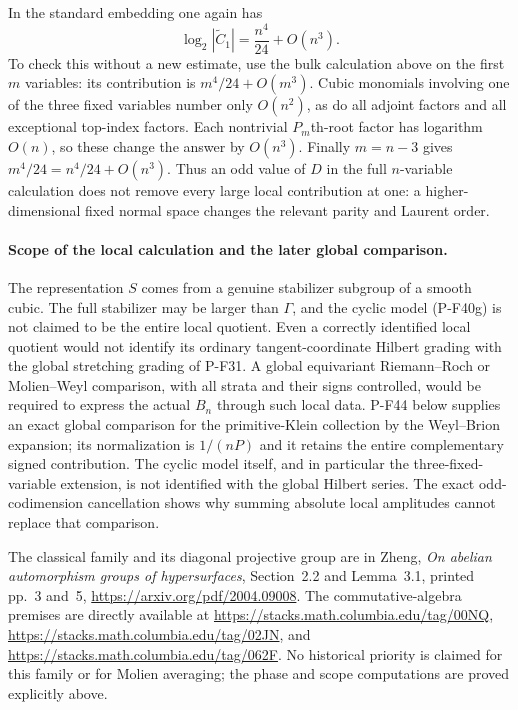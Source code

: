 \documentclass[11pt,a4paper]{article}
\begin{document}
In the standard embedding one again has
\[
                  \log_2|\widetilde C_1|
                             =\frac{n^4}{24}+O(n^3).
 \tag{P-F40o}
\]
To check this without a new estimate, use the bulk calculation
above on the first $m$ variables: its contribution is
$m^4/24+O(m^3)$. Cubic monomials involving one of the three
fixed variables number only $O(n^2)$, as do all adjoint
factors and all exceptional top-index factors. Each nontrivial
$P_m$th-root factor has logarithm $O(n)$, so these change the
answer by $O(n^3)$. Finally $m=n-3$ gives
$m^4/24=n^4/24+O(n^3)$.
Thus an odd value of $D$ in the full $n$-variable calculation does not remove every
large local contribution at one: a higher-dimensional fixed
normal space changes the relevant parity and Laurent order.

\paragraph{Scope of the local calculation and the later global comparison.}
The representation $S$ comes from a genuine stabilizer subgroup
of a smooth cubic. The full stabilizer may be larger than
$\Gamma$, and the cyclic model (P-F40g) is not claimed to be
the entire local quotient. Even a correctly identified local
quotient would not identify its ordinary tangent-coordinate
Hilbert grading with the global stretching grading of P-F31.
A global equivariant Riemann--Roch or Molien--Weyl comparison,
with all strata and their signs controlled, would be required
to express the actual $B_n$ through such local data.
P-F44 below supplies an exact global comparison for the
primitive-Klein collection by the Weyl--Brion expansion;
its normalization is $1/(nP)$ and it retains the entire
complementary signed contribution. The cyclic model itself,
and in particular the three-fixed-variable extension, is
not identified with the global Hilbert series. The exact
odd-codimension cancellation shows why summing absolute
local amplitudes cannot replace that comparison.

The classical family and its diagonal projective group are in
Zheng, \emph{On abelian automorphism groups of hypersurfaces},
Section~2.2 and Lemma~3.1, printed pp.~3 and~5,
\url{https://arxiv.org/pdf/2004.09008}.
The commutative-algebra premises are directly available at
\url{https://stacks.math.columbia.edu/tag/00NQ},
\url{https://stacks.math.columbia.edu/tag/02JN}, and
\url{https://stacks.math.columbia.edu/tag/062F}.
No historical priority is claimed for this family or for
Molien averaging; the phase and scope computations are
proved explicitly above.
\end{document}
